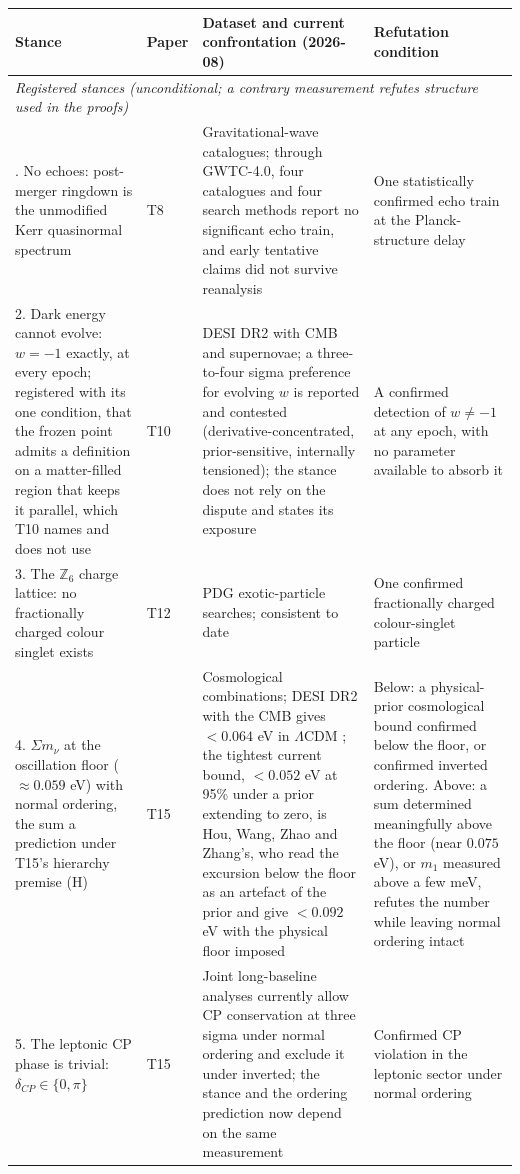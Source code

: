 \documentclass[11pt]{article}
\theoremstyle{definition}
\theoremstyle{plain}
\providecommand{\Z}{}\renewcommand{\Z}{\mathbb{Z}}
\providecommand{\mnu}{}\renewcommand{\mnu}{\Sigma m_{\nu}}
\begin{document}
  \begin{longtable}{p{} p{} p{} p{}}
\toprule
\textbf{Stance} & \textbf{Paper} & \textbf{Dataset and current confrontation (2026-08)} & \textbf{Refutation condition} \\
\midrule
\endhead
\multicolumn{4}{l}{\emph{Registered stances (unconditional; a contrary measurement refutes structure used in the proofs)}}\\
\addlinespace[2pt]
1. No echoes: post-merger ringdown is the unmodified Kerr quasinormal spectrum & T8 & Gravitational-wave catalogues; through GWTC-4.0, four catalogues and four search methods report no significant echo train, and early tentative claims did not survive reanalysis \cite{GWTC4} & One statistically confirmed echo train at the Planck-structure delay \\
2. Dark energy cannot evolve: $w = -1$ exactly, at every epoch; registered with its one condition, that the frozen point admits a definition on a matter-filled region that keeps it parallel, which T10 names and does not use & T10 & DESI DR2 with CMB and supernovae; a three-to-four sigma preference for evolving $w$ is reported and contested (derivative-concentrated, prior-sensitive, internally tensioned); the stance does not rely on the dispute and states its exposure \cite{DESIDR2} & A confirmed detection of $w \neq -1$ at any epoch, with no parameter available to absorb it \\
3. The $\Z_{6}$ charge lattice: no fractionally charged colour singlet exists & T12 & PDG exotic-particle searches; consistent to date \cite{PDG} & One confirmed fractionally charged colour-singlet particle \\
4. $\mnu$ at the oscillation floor ($\approx 0.059$ eV) with normal ordering, the sum a prediction under T15's hierarchy premise (H) & T15 & Cosmological combinations; DESI DR2 with the CMB gives $< 0.064$ eV in $\Lambda$CDM \cite{DESIDR2}; the tightest current bound, $< 0.052$ eV at 95\% under a prior extending to zero, is Hou, Wang, Zhao and Zhang's, who read the excursion below the floor as an artefact of the prior and give $< 0.092$ eV with the physical floor imposed \cite{HouWangZhaoZhang2026} & Below: a physical-prior cosmological bound confirmed below the floor, or confirmed inverted ordering. Above: a sum determined meaningfully above the floor (near $0.075$ eV), or $m_{1}$ measured above a few meV, refutes the number while leaving normal ordering intact \\
5. The leptonic CP phase is trivial: $\delta_{CP} \in \{0, \pi\}$ & T15 & Joint long-baseline analyses currently allow CP conservation at three sigma under normal ordering and exclude it under inverted; the stance and the ordering prediction now depend on the same measurement & Confirmed CP violation in the leptonic sector under normal ordering \\

\end{longtable}
\end{document}
